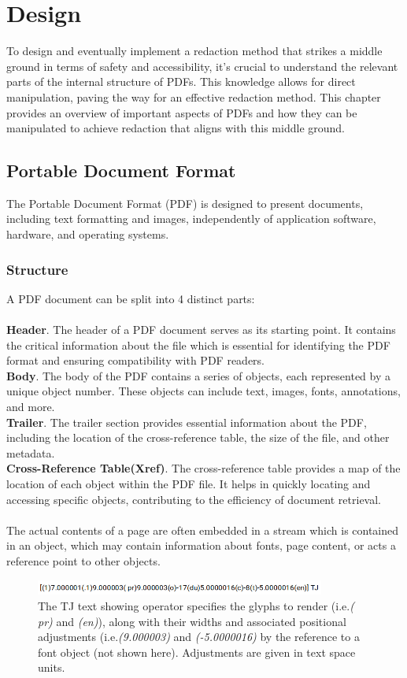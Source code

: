 \chapter{Design}
To design and eventually implement a redaction method that strikes a middle ground in terms of safety and accessibility, it's crucial to understand the relevant parts of the internal structure of PDFs. This knowledge allows for direct manipulation, paving the way for an effective redaction method. This chapter provides an overview of important aspects of PDFs and how they can be manipulated to achieve redaction that aligns with this middle ground.

\section{Portable Document Format}
The Portable Document Format (PDF) is designed to present documents, including text formatting and images, independently of application software, hardware, and operating systems.
\subsection{Structure}
A PDF document can be split into 4 distinct parts: 
\\\\
\textbf{Header}. The header of a PDF document serves as its starting point. It contains the critical information about the file which is essential for identifying the PDF format and ensuring compatibility with PDF readers. \\
\textbf{Body}. The body of the PDF contains a series of objects, each represented by a unique object number. These objects can include text, images, fonts, annotations, and more.\\
\textbf{Trailer}. The trailer section provides essential information about the PDF, including the location of the cross-reference table, the size of the file, and other metadata. \\
\textbf{Cross-Reference Table(Xref)}. The cross-reference table provides a map of the location of each object within the PDF file. It helps in quickly locating and accessing specific objects, contributing to the efficiency of document retrieval.
\\\\
The actual contents of a page are often embedded in a stream which is contained in an object, which may contain information about fonts, page content, or acts a reference point to other objects.  
\begin{figure}[h]
\includegraphics[width=0.85\textwidth]{latex/media/TJexample.png}
\centering
\caption{The TJ text showing operator specifies the glyphs to render (i.e.\textit{( pr)} and \textit{(en)}), along with their widths and associated positional adjustments (i.e.\textit{(9.000003)} and \textit{(-5.0000016)} by the reference to a font object (not shown here). Adjustments are given in text space units. }
\label{fig:tjexample}
\end{figure}
